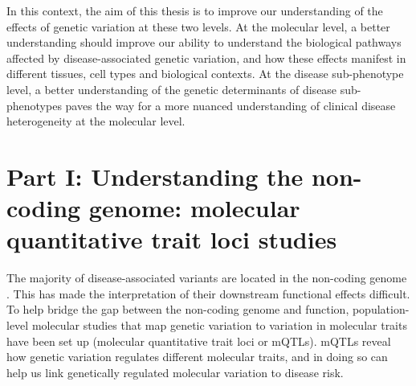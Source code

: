 In this context, the aim of this thesis is to improve our understanding of the effects of genetic variation at these two levels. At the molecular level, a better understanding should improve our ability to understand the biological pathways affected by disease-associated genetic variation, and how these effects manifest in different tissues, cell types and biological contexts. At the disease sub-phenotype level, a better understanding of the genetic determinants of disease sub-phenotypes paves the way for a more nuanced understanding of clinical disease heterogeneity at the molecular level. 



\section{Part I: Understanding the non-coding genome: molecular quantitative trait loci studies}
The majority of disease-associated variants are located in the non-coding genome \cite{Ahonen2009-eo,Degner2012-dq,Trynka2013-qs,Hindorff2009-te}. This has made the interpretation of their downstream functional effects difficult. To help bridge the gap between the non-coding genome and function, population-level molecular studies that map genetic variation to variation in molecular traits have been set up (molecular quantitative trait loci or mQTLs). mQTLs reveal how genetic variation regulates different molecular traits, and in doing so can help us link genetically regulated molecular variation to disease risk.\\ 

